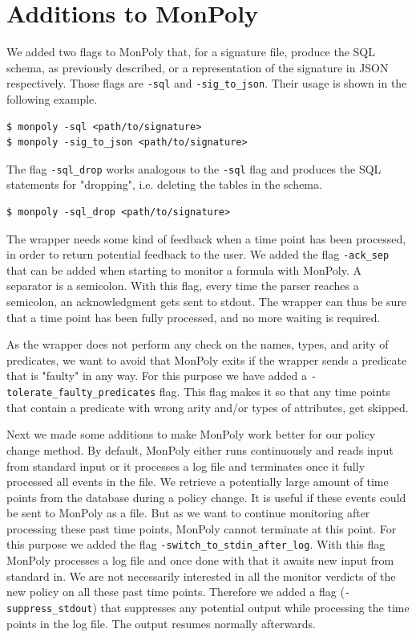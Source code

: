 \section{Additions to MonPoly}
We added two flags to MonPoly that, for a signature file, produce the SQL schema, as previously described, or a representation of the signature in JSON respectively.
Those flags are \texttt{-sql} and \texttt{-sig\_to\_json}.
Their usage is shown in the following example.
\begin{verbatim}
$ monpoly -sql <path/to/signature>
$ monpoly -sig_to_json <path/to/signature>
\end{verbatim}
The flag \texttt{-sql\_drop} works analogous to the \texttt{-sql} flag and produces the SQL statements for "dropping", i.e. deleting the tables in the schema.
\begin{verbatim}
$ monpoly -sql_drop <path/to/signature>
\end{verbatim}

The wrapper needs some kind of feedback when a time point has been processed, in order to return potential feedback to the user.
We added the flag \texttt{-ack\_sep} that can be added when starting to monitor a formula with MonPoly.
A separator is a semicolon.
With this flag, every time the parser reaches a semicolon, an acknowledgment gets sent to stdout.
The wrapper can thus be sure that a time point has been fully processed, and no more waiting is required.

As the wrapper does not perform any check on the names, types, and arity of predicates, we want to avoid that MonPoly exits if the wrapper sends a predicate that is "faulty" in any way.
For this purpose we have added a \texttt{-tolerate\_faulty\_predicates} flag.
This flag makes it so that any time points that contain a predicate with wrong arity and/or types of attributes, get skipped.

Next we made some additions to make MonPoly work better for our policy change method.
By default, MonPoly either runs continuously and reads input from standard input or it processes a log file and terminates once it fully processed all events in the file.
We retrieve a potentially large amount of time points from the database during a policy change.
It is useful if these events could be sent to MonPoly as a file.
But as we want to continue monitoring after processing these past time points, MonPoly cannot terminate at this point.
For this purpose we added the flag \texttt{-switch\_to\_stdin\_after\_log}.
With this flag MonPoly processes a log file and once done with that it awaits new input from standard in.
We are not necessarily interested in all the monitor verdicts of the new policy on all these past time points.
Therefore we added a flag (\texttt{-suppress\_stdout}) that suppresses any potential output while processing the time points in the log file.
The output resumes normally afterwards.

